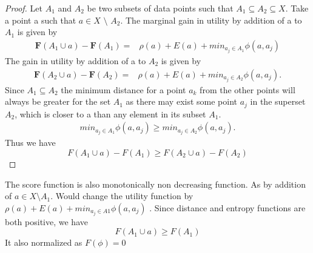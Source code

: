 \documentclass[a4paper,twoside]{iiththesis}
\theoremstyle{definition}
\theoremstyle{definition}
\theoremstyle{remark}
\begin{document}
\begin{proof}
Let $A_1$ and $A_2$ be two subsets of data points such that $A_1 \subseteq A_2 \subseteq X$. Take a point a such that $a \in X$ $\setminus$ $A_2 $.  The marginal gain in utility by addition of a to $A_1$ is given by
\begin{align}
        \mathbf{F}(A_1 \cup {a}) -  \mathbf{F}(A_1)=& \rho(a) + E(a)+ min_{a_j \in A_1} \phi(a,a_j)
\end{align}
The gain in utility by addition of a to $A_2$ is given by
\begin{align}
    \mathbf{F}(A_2 \cup {a}) - \mathbf{F}(A_2)=&\rho(a)+ E(a)+ min_{a_j \in A_2} \phi(a,a_j).
\end{align}
    Since $A_1 \subseteq A_2 $ the minimum distance for a point $a_k$ from the other points will always be greater for the set $A_1$ as there may exist some point $a_j$ in the superset $A_2$, which is closer to a than any element in its subset $A_1$.
\begin{align}
          min_{a_j \in A_1} \phi(a,a_j) \geq min_{a_j \in A_2} \phi(a,a_j).
\end{align}
Thus we have 
\begin{equation}
F(A_1 \cup {a}) - F(A_1) \geq F(A_2 \cup {a}) - F(A_2)
\end{equation}
\end{proof}
The score function is also monotonically non decreasing function. As by addition of $a \in X  \setminus A_1$. Would change the utility function by $\rho(a) + E(a) + min_{a_j \in A1} \phi(a,a_j)$ . Since distance and entropy functions are both positive, we have  
\begin{equation}
F(A_1 \cup a) \geq F(A_1)
\end{equation}
It also normalized as  $F(\phi) = 0$
\end{document}
